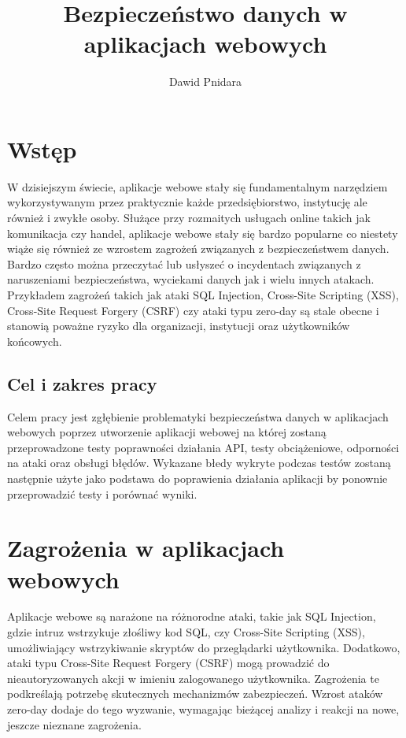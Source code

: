\documentclass[12pt,twoside]{article}
\author{Dawid Pnidara}
\title{Bezpieczeństwo danych w aplikacjach webowych}
\begin{document}
\maketitle

\blankpage

\tableofcontents

\clearpage
\blankpage

\section{Wstęp}
W dzisiejszym świecie, aplikacje webowe stały się fundamentalnym narzędziem wykorzystywanym przez praktycznie każde przedsiębiorstwo, instytucję ale również i zwykłe osoby. Służące przy rozmaitych usługach online takich jak komunikacja czy handel, aplikacje webowe stały się bardzo popularne co niestety wiąże się również ze wzrostem zagrożeń związanych z bezpieczeństwem danych. 
Bardzo często można przeczytać lub usłyszeć o incydentach związanych z naruszeniami bezpieczeństwa, wyciekami danych jak i wielu innych atakach. Przykładem zagrożeń takich jak ataki SQL Injection, Cross-Site Scripting (XSS), Cross-Site Request Forgery (CSRF) czy ataki typu zero-day są stale obecne i stanowią poważne ryzyko dla organizacji, instytucji oraz użytkowników końcowych.
\subsection{Cel i zakres pracy}
Celem pracy jest zgłębienie problematyki bezpieczeństwa danych w aplikacjach webowych poprzez utworzenie aplikacji webowej na której zostaną przeprowadzone testy poprawności działania API, testy obciążeniowe, odporności na ataki oraz obsługi błędów. Wykazane błedy wykryte podczas testów zostaną następnie użyte jako podstawa do poprawienia działania aplikacji by ponownie przeprowadzić testy i porównać wyniki.
\section{Zagrożenia w aplikacjach webowych}

Aplikacje webowe są narażone na różnorodne ataki, takie jak SQL Injection, gdzie intruz wstrzykuje złośliwy kod SQL, czy Cross-Site Scripting (XSS), umożliwiający wstrzykiwanie skryptów do przeglądarki użytkownika. Dodatkowo, ataki typu Cross-Site Request Forgery (CSRF) mogą prowadzić do nieautoryzowanych akcji w imieniu zalogowanego użytkownika. Zagrożenia te podkreślają potrzebę skutecznych mechanizmów zabezpieczeń. Wzrost ataków zero-day dodaje do tego wyzwanie, wymagając bieżącej analizy i reakcji na nowe, jeszcze nieznane zagrożenia.
\end{document}
